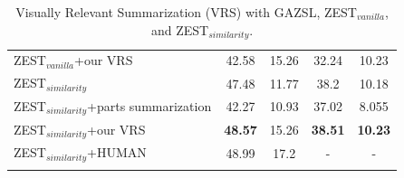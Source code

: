 \documentclass[11pt,a4paper]{article}
\begin{document}
\begin{table}[t]
{\begin{tabular}{l|cc|cc}
                 
  ZEST$_{vanilla}$+our VRS                             & {42.58}                                  & {15.26}                                 & {32.24}      & {10.23}        \\
ZEST$_{similarity}$                                & 47.48                                           & 11.77                                          & 38.2
                & 10.18                 \\
ZEST$_{similarity}$+parts summarization                                & 42.27
                                           & 10.93
                                          & 37.02

                & 8.055
                 \\
ZEST$_{similarity}$+our VRS                             & \textbf{48.57}                                  & {15.26}                                 & \textbf{38.51}      & \textbf{10.23}        \\

ZEST$_{similarity}$+HUMAN                          & 48.99                                & 17.2                                           & -                    & -                     \\ 
\Xhline{6\arrayrulewidth}
\end{tabular}
}
    \caption{Visually Relevant Summarization (VRS) with GAZSL, ZEST$_{vanilla}$, and ZEST$_{similarity}$.  }%
    \label{table:summarization}%
\end{table}





\begin{table}[t]
\centering
    \caption{Zest model with different similarity methods}%
    \label{table:similarity}%
\end{table}
\end{document}

